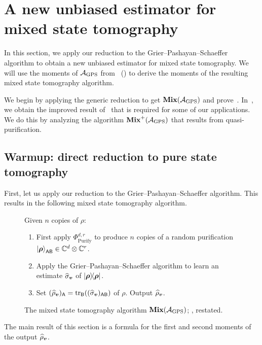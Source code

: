 \documentclass{article}
\newcommand{\mixed}{\textup{\textbf{Mix}}}
\newcommand{\gps}{\calA_{\mathrm{GPS}}}
\newcommand{\purifychan}{\Phi_{\mathrm{Purify}}}
\newcommand{\reg}[1]{\mathsf{#1}}
\begin{document}
\section{A new unbiased estimator for mixed state tomography}\label{sec:unbiased-estimator}

In this section, we apply our reduction to the Grier--Pashayan--Schaeffer algorithm to obtain a new unbiased estimator for mixed state tomography. We will use the moments of $\mathcal{A}_{\mathrm{GPS}}$ from~ () to derive the moments of the resulting mixed state tomography algorithm.

We begin by applying the generic reduction to get $\mixed(\calA_{\mathrm{GPS}})$ and prove~. In~, we obtain the improved result of~ that is required for some of our applications. We do this by analyzing the algorithm $\mixed^+(\calA_{\mathrm{GPS}})$ that results from quasi-purification.


\subsection{Warmup: direct reduction to pure state tomography}\label{sec:gps-mixed}

First, let us apply our reduction to the Grier--Pashayan--Schaeffer algorithm.
This results in the following mixed state tomography algorithm.

{
\begin{figure}[H]
Given $n$ copies of $\rho$:
\begin{enumerate}
    \item\label{item:purify} First apply $\purifychan^{d, r}$ to produce $n$ copies of a random purification $\ket{\brho}_{\reg{AB}} \in \C^d \otimes \C^r$.
    \item Apply the Grier--Pashayan--Schaeffer algorithm to learn an estimate $\widehat{\sigma}_{\boldsymbol{v}}$ of $\ketbra{\boldsymbol{\rho}}$.
    \item Set $(\widehat{\rho}_{\bv})_{\reg{A}} = \tr_\reg{B}((\widehat{\sigma}_{\bv})_{\reg{AB}})$ of $\rho$. Output $\widehat{\rho}_{\boldsymbol{v}}$.
\end{enumerate}
\caption{The mixed state tomography algorithm $\mixed(\gps)$; , restated.}
\label{fig:gps-reduction-basic-restate}
\end{figure}
}

\noindent
The main result of this section is a formula for the first and second moments of the output $\widehat{\rho}_{\boldsymbol{v}}$.
\end{document}
